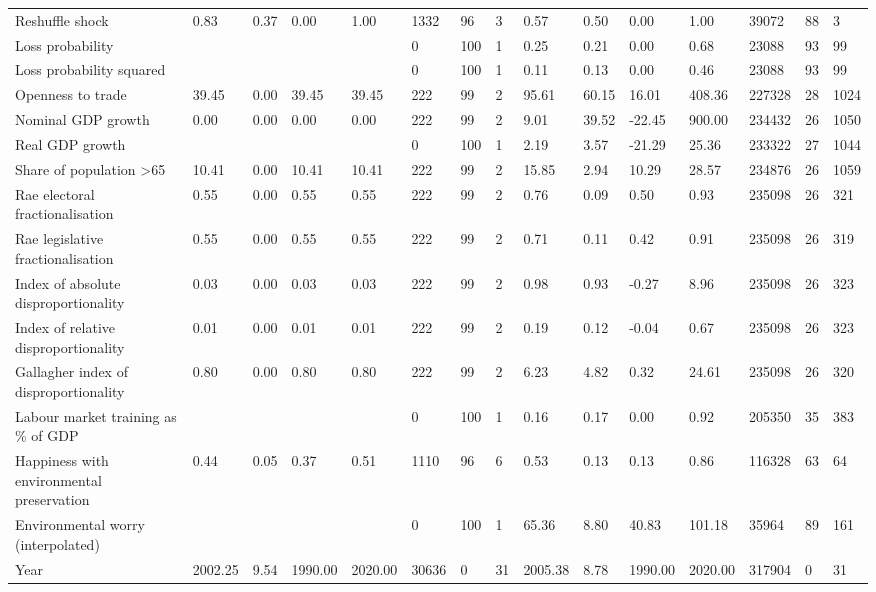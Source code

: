 \begin{longtable}{lllllllllllllll}
Reshuffle shock & 0.83 & 0.37 & 0.00 & 1.00 & 1332 & 96 & 3 & 0.57 & 0.50 & 0.00 & 1.00 & 39072 & 88 & 3\\
\addlinespace
Loss probability &  &  &  &  & 0 & 100 & 1 & 0.25 & 0.21 & 0.00 & 0.68 & 23088 & 93 & 99\\
Loss probability squared &  &  &  &  & 0 & 100 & 1 & 0.11 & 0.13 & 0.00 & 0.46 & 23088 & 93 & 99\\
Openness to trade & 39.45 & 0.00 & 39.45 & 39.45 & 222 & 99 & 2 & 95.61 & 60.15 & 16.01 & 408.36 & 227328 & 28 & 1024\\
Nominal GDP growth & 0.00 & 0.00 & 0.00 & 0.00 & 222 & 99 & 2 & 9.01 & 39.52 & -22.45 & 900.00 & 234432 & 26 & 1050\\
Real GDP growth &  &  &  &  & 0 & 100 & 1 & 2.19 & 3.57 & -21.29 & 25.36 & 233322 & 27 & 1044\\
\addlinespace
Share of population >65 & 10.41 & 0.00 & 10.41 & 10.41 & 222 & 99 & 2 & 15.85 & 2.94 & 10.29 & 28.57 & 234876 & 26 & 1059\\
Rae electoral fractionalisation & 0.55 & 0.00 & 0.55 & 0.55 & 222 & 99 & 2 & 0.76 & 0.09 & 0.50 & 0.93 & 235098 & 26 & 321\\
Rae legislative fractionalisation & 0.55 & 0.00 & 0.55 & 0.55 & 222 & 99 & 2 & 0.71 & 0.11 & 0.42 & 0.91 & 235098 & 26 & 319\\
Index of absolute disproportionality & 0.03 & 0.00 & 0.03 & 0.03 & 222 & 99 & 2 & 0.98 & 0.93 & -0.27 & 8.96 & 235098 & 26 & 323\\
Index of relative disproportionality & 0.01 & 0.00 & 0.01 & 0.01 & 222 & 99 & 2 & 0.19 & 0.12 & -0.04 & 0.67 & 235098 & 26 & 323\\
\addlinespace
Gallagher index of disproportionality & 0.80 & 0.00 & 0.80 & 0.80 & 222 & 99 & 2 & 6.23 & 4.82 & 0.32 & 24.61 & 235098 & 26 & 320\\
Labour market training as \% of GDP &  &  &  &  & 0 & 100 & 1 & 0.16 & 0.17 & 0.00 & 0.92 & 205350 & 35 & 383\\
Happiness with environmental preservation & 0.44 & 0.05 & 0.37 & 0.51 & 1110 & 96 & 6 & 0.53 & 0.13 & 0.13 & 0.86 & 116328 & 63 & 64\\
Environmental worry (interpolated) &  &  &  &  & 0 & 100 & 1 & 65.36 & 8.80 & 40.83 & 101.18 & 35964 & 89 & 161\\
Year & 2002.25 & 9.54 & 1990.00 & 2020.00 & 30636 & 0 & 31 & 2005.38 & 8.78 & 1990.00 & 2020.00 & 317904 & 0 & 31\\
\bottomrule
\end{longtable}
